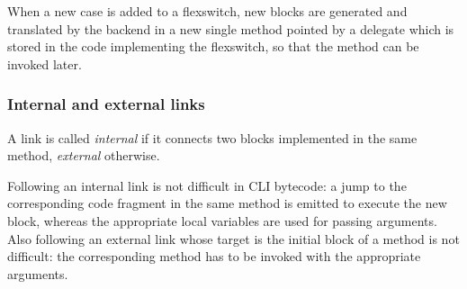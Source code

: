 When  a new case is added to a flexswitch, new blocks are generated
and translated by the backend in a new single method pointed
by a delegate which is stored in the code implementing the flexswitch,
so that the method can be invoked later.

\subsubsection{Internal and external links}

A link is called \emph{internal} if it connects two blocks implemented in the same method,
 \emph{external} otherwise.

Following an internal link is not difficult in CLI bytecode: a jump to
the corresponding code fragment in the same method is emitted 
to execute the new block, whereas the appropriate local variables are
used for passing arguments.
Also following an external link whose target is the initial block of a
method is not difficult: the corresponding method has to be invoked
with the appropriate arguments.


